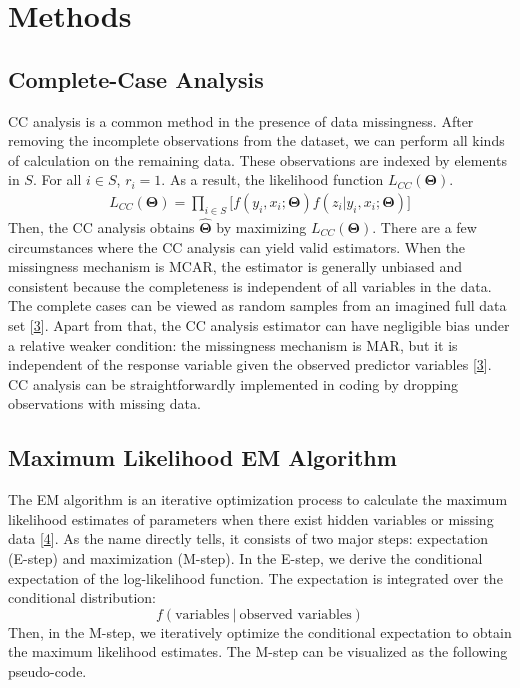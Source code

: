 \documentclass[
  twocolumn]{article}
\begin{document}
\hypertarget{methods}{%
\section{Methods}\label{methods}}

\hypertarget{complete-case-analysis}{%
\subsection{Complete-Case Analysis}\label{complete-case-analysis}}

CC analysis is a common method in the presence of data missingness.
After removing the incomplete observations from the dataset, we can
perform all kinds of calculation on the remaining data. These
observations are indexed by elements in \(S\). For all \(i \in S\),
\(r_i = 1\). As a result, the likelihood function
\(L_{CC}(\boldsymbol{\Theta})\).\\
\[
\begin{aligned}
L_{CC}(\boldsymbol\Theta)
= \prod_{i \in S} \big[ f(y_i, x_i; \boldsymbol\Theta)f(z_i|y_i, x_i; \boldsymbol\Theta) \big]
\end{aligned}
\] Then, the CC analysis obtains \(\hat{\boldsymbol\Theta}\) by
maximizing \(L_{CC}(\boldsymbol\Theta)\). There are a few circumstances
where the CC analysis can yield valid estimators. When the missingness
mechanism is MCAR, the estimator is generally unbiased and consistent
because the completeness is independent of all variables in the data.
The complete cases can be viewed as random samples from an imagined full
data set {[}\protect\hyperlink{ref-seaman2013review}{3}{]}. Apart from
that, the CC analysis estimator can have negligible bias under a
relative weaker condition: the missingness mechanism is MAR, but it is
independent of the response variable given the observed predictor
variables {[}\protect\hyperlink{ref-seaman2013review}{3}{]}. CC analysis
can be straightforwardly implemented in coding by dropping observations
with missing data.

\hypertarget{maximum-likelihood-em-algorithm}{%
\subsection{Maximum Likelihood EM
Algorithm}\label{maximum-likelihood-em-algorithm}}

The EM algorithm is an iterative optimization process to calculate the
maximum likelihood estimates of parameters when there exist hidden
variables or missing data
{[}\protect\hyperlink{ref-dempster1977maximum}{4}{]}. As the name
directly tells, it consists of two major steps: expectation (E-step) and
maximization (M-step). In the E-step, we derive the conditional
expectation of the log-likelihood function. The expectation is
integrated over the conditional distribution:
\[f(\text{variables}~|~\text{observed variables})\] Then, in the M-step,
we iteratively optimize the conditional expectation to obtain the
maximum likelihood estimates. The M-step can be visualized as the
following pseudo-code.
\end{document}
